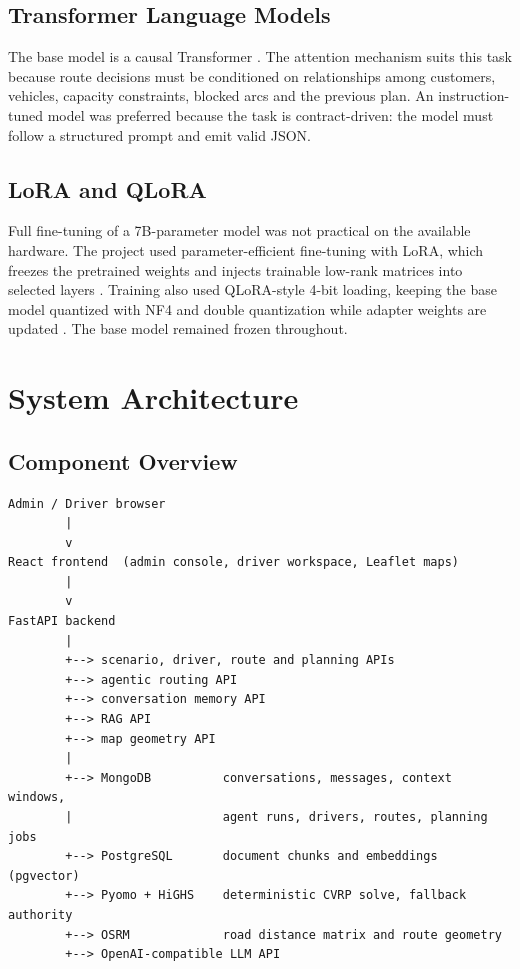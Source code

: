 \documentclass[11pt,a4paper]{article}
\begin{document}
\subsection{Transformer Language Models}

The base model is a causal Transformer \cite{vaswani2017}. The attention mechanism suits this task
because route decisions must be conditioned on relationships among customers, vehicles, capacity
constraints, blocked arcs and the previous plan. An instruction-tuned model was preferred because
the task is contract-driven: the model must follow a structured prompt and emit valid JSON.

\subsection{LoRA and QLoRA}

Full fine-tuning of a 7B-parameter model was not practical on the available hardware. The project
used parameter-efficient fine-tuning with LoRA, which freezes the pretrained weights and injects
trainable low-rank matrices into selected layers \cite{lora}. Training also used QLoRA-style 4-bit
loading, keeping the base model quantized with NF4 and double quantization while adapter weights are
updated \cite{qlora}. The base  model remained frozen throughout.

\section{System Architecture}

\subsection{Component Overview}

\begin{verbatim}
Admin / Driver browser
        |
        v
React frontend  (admin console, driver workspace, Leaflet maps)
        |
        v
FastAPI backend
        |
        +--> scenario, driver, route and planning APIs
        +--> agentic routing API
        +--> conversation memory API
        +--> RAG API
        +--> map geometry API
        |
        +--> MongoDB          conversations, messages, context windows,
        |                     agent runs, drivers, routes, planning jobs
        +--> PostgreSQL       document chunks and embeddings (pgvector)
        +--> Pyomo + HiGHS    deterministic CVRP solve, fallback authority
        +--> OSRM             road distance matrix and route geometry
        +--> OpenAI-compatible LLM API
\end{verbatim}
\end{document}
